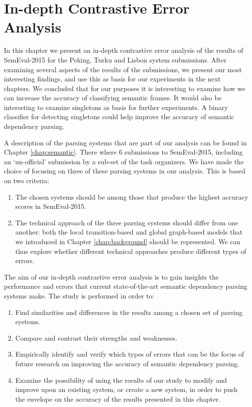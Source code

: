\chapter{In-depth Contrastive Error Analysis}
\label{chap:analysis}



In this chapter we present an in-depth contrastive error analysis of the results of SemEval-2015 for the Peking, Turku and Lisbon system submissions. After examining several aspects of the results of the submissions, we present our most interesting findings, and use this as basis for our experiments in the next chapters. We concluded that for our purposes it is interesting to examine how we can increase the accuracy of classifying semantic frames. It would also be interesting to examine singletons as basis for further experiments. A binary classifier for detecting singletons could help improve the accuracy of semantic dependency parsing.

A description of the parsing systems that are part of our analysis can be found in Chapter \ref{chap:semantic}. There where 6 submissions to SemEval-2015, including an `un-official' submission by a sub-set of the task organizers. We have made the choice of focusing on three of these parsing systems in our analysis. This is based on two criteria:

\begin{enumerate}
    \item The chosen systems should be among those that produce the highest accuracy scores in SemEval-2015.
    \item The technical approach of the three parsing systems should differ from one another: both the local transition-based and global graph-based models that we introduced in Chapter \ref{chap:background} should be represented. We can thus explore whether different technical approaches produce different types of errors.
\end{enumerate}

The aim of our in-depth contrastive error analysis is to gain insights the performance and errors that current state-of-the-art semantic dependency parsing systems make. The study is performed in order to:

\begin{enumerate}
    \item Find similarities and differences in the results among a chosen set of parsing systems.
    \item Compare and contrast their strengths and weaknesses.
    \item Empirically identify and verify which types of errors that can be the focus of future research on improving the accuracy of semantic dependency parsing.
    \item Examine the possibility of using the results of our study to modify and improve upon an existing system, or create a new system, in order to push the envelope on the accuracy of the results presented in this chapter.
\end{enumerate}

